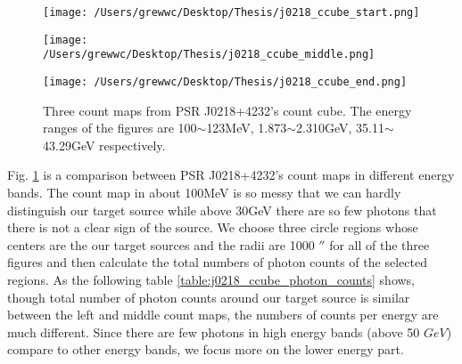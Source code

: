 \documentclass[12pt]{report}
\newcommand{\mycaption}[1]{\protect \caption{#1}}
\begin{document}
          \begin{figure}[!ht]
            \begin{minipage}{0.32\textwidth}
              \begin{center} 
                \texttt{[image: /Users/grewwc/Desktop/Thesis/j0218\_ccube\_start.png]}
              \end{center}
            \end{minipage}
            \begin{minipage}{0.32\textwidth}
              \begin{center}
                \texttt{[image: /Users/grewwc/Desktop/Thesis/j0218\_ccube\_middle.png]}
              \end{center}
            \end{minipage}
            \begin{minipage}{0.32\textwidth}
              \begin{center}
              \texttt{[image: /Users/grewwc/Desktop/Thesis/j0218\_ccube\_end.png]}
              \end{center}
            \end{minipage}
            \mycaption{Three count maps from PSR J0218+4232's count cube. The energy ranges of 
              the figures are 
              100$\sim$123MeV, 1.873$\sim$2.310GeV, 35.11$\sim$43.29GeV respectively.}
            \label{fig: j0218_ccube_bin_1_and_15}
          \end{figure}
          
          Fig. \ref{fig: j0218_ccube_bin_1_and_15} is a comparison between PSR J0218+4232's count maps in 
          different energy 
          bands. The count map in about 100MeV is so messy that we can hardly distinguish our target source 
          while above 30GeV there are so few photons that there is not a clear sign of the source. 
          We choose three circle regions whose centers are the our target sources and the radii are 1000 $''$ 
          for 
          all of the three figures and then calculate the total numbers of photon counts of the selected 
          regions. 
          As the following table \ref{table:j0218_ccube_photon_counts}
          shows, though total number of photon counts around our target source is similar between the left 
          and middle
          count maps, the 
          numbers of counts per energy are much different. Since there are few photons in high energy bands 
          (above 50 $GeV$) compare to other energy bands, we focus more on the lower energy part. 
\end{document}
